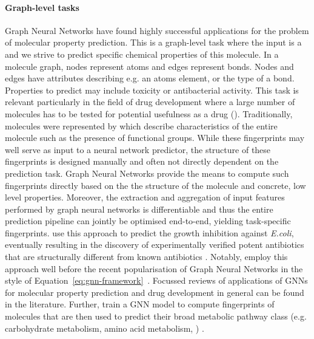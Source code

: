 \documentclass[
	fontsize=10pt, %
	twoside=false, %
	secnumdepth=1, %
  toc=indentunnumbered %
]{kaobook}
\begin{document}
\paragraph{Graph-level tasks} Graph Neural Networks have found highly successful
applications for the problem of molecular property prediction. This is a
graph-level task where the input is a  and we strive to
predict specific chemical properties of this molecule. In a molecule graph,
nodes represent atoms and edges represent bonds. Nodes and edges have attributes
describing e.g. an atoms element, or the type of a bond. Properties to predict
may include toxicity or antibacterial activity. This task is relevant
particularly in the field of drug development where a large number of molecules
has to be tested for potential usefulness as a drug ().
%
Traditionally, molecules were represented by  which
describe characteristics of the entire molecule such as the presence of
functional groups. While these fingerprints may well serve as input to a neural
network predictor, the structure of these fingerprints is designed manually and
often not directly dependent on the prediction task.
Graph Neural Networks provide the means to compute such fingerprints directly
based on the the structure of the molecule and concrete, low level properties.
Moreover, the extraction and aggregation of input features performed by graph
neural networks is differentiable and thus the entire prediction pipeline can
jointly be optimised end-to-end, yielding task-specific fingerprints.
\citeauthor{stokes_DeepLearningApproach_2020} use this approach to predict the
growth inhibition against \textit{E.coli}, eventually resulting in the discovery
of experimentally verified potent antibiotics that are structurally different
from known antibiotics \cite{stokes_DeepLearningApproach_2020}.
%
Notably, \citeauthor{duvenaud_convolutional_2015} employ this approach well
before the recent popularisation of Graph Neural Networks in the style of  
Equation~\ref{eq:gnn-framework}~\cite{duvenaud_convolutional_2015}.
Focussed reviews of applications of GNNs for molecular property prediction
\cite{wieder_CompactReviewMolecular_2020}
and drug development in general
\cite{gaudelet_utilising_2020}
can be found in the literature.
%
Further, \citeauthor{baranwal_deep_2020} train a GNN model to compute
fingerprints of molecules that are then used to predict their broad metabolic
pathway class (e.g. carbohydrate metabolism, amino acid metabolism, \etc)
\cite{baranwal_deep_2020}.
\end{document}
